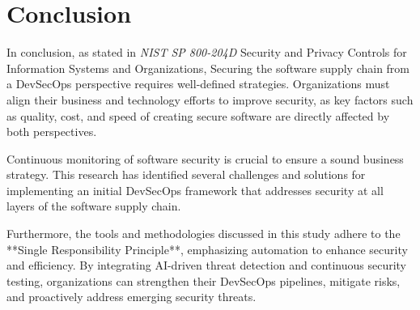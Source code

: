 \documentclass[conference]{IEEEtran}
\begin{document}
\section{Conclusion}
In conclusion, as stated in \textit{NIST SP 800-204D} Security and Privacy Controls for Information Systems and Organizations, Securing the software supply chain from a DevSecOps perspective requires well-defined strategies. Organizations must align their business and technology efforts to improve security, as key factors such as quality, cost, and speed of creating secure software are directly affected by both perspectives.

Continuous monitoring of software security is crucial to ensure a sound business strategy. This research has identified several challenges and solutions for implementing an initial DevSecOps framework that addresses security at all layers of the software supply chain.  

Furthermore, the tools and methodologies discussed in this study adhere to the **Single Responsibility Principle**, emphasizing automation to enhance security and efficiency. By integrating AI-driven threat detection and continuous security testing, organizations can strengthen their DevSecOps pipelines, mitigate risks, and proactively address emerging security threats.

%

\end{document}
